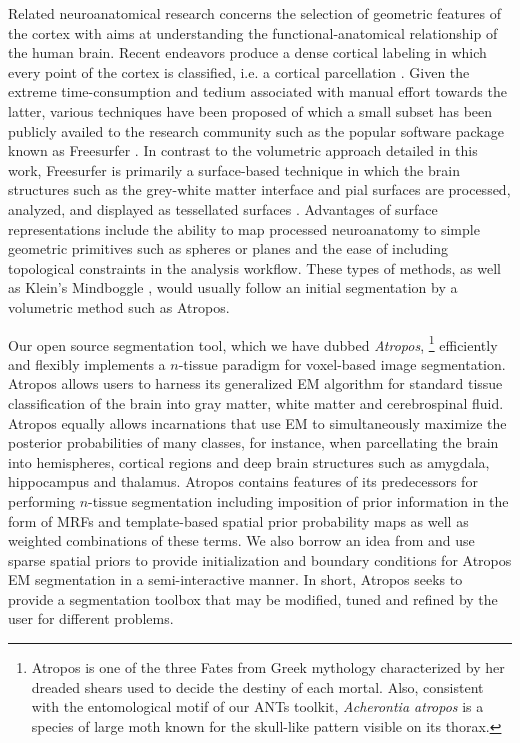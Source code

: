 \documentclass[11pt,english]{article}
\begin{document}
Related neuroanatomical research concerns the selection of geometric
features of the cortex \citep[e.g.][]{Goualher1999} with aims at
understanding the functional-anatomical relationship of the human
brain. Recent endeavors produce a dense cortical labeling in which
every point of the cortex is classified, i.e. a cortical parcellation
\citep{Fischl2004,Heckemann2006,Destrieux2010}.  Given the extreme
time-consumption and tedium associated with manual effort towards the
latter, various techniques have been proposed of which a small subset
has been publicly availed to the research community such as the
popular software package known as Freesurfer
\citep{Dale1999,Fischl1999,Fischl2004}.  In contrast to the volumetric
approach detailed in this work, Freesurfer is primarily a
surface-based technique in which the brain structures such as the
grey-white matter interface and pial surfaces are processed, analyzed,
and displayed as tessellated surfaces  \cite{Dale1999,Fischl1999}.
Advantages of surface representations include the ability to map
processed neuroanatomy to simple geometric primitives such as spheres
or planes and the ease of including topological constraints in the
analysis workflow.  These types of methods, as well as Klein's
Mindboggle \cite{Klein2005}, would usually follow an initial segmentation by a volumetric method such as Atropos.  



Our open source segmentation tool, which we have dubbed {\em
Atropos}, 
\footnote{ Atropos is one of the three Fates from Greek
mythology characterized by her dreaded shears used to decide the
destiny of each mortal.  Also, consistent with the entomological motif
of our ANTs toolkit, {\it Acherontia atropos} is a species of large
moth known for the skull-like pattern visible on its thorax.  }
efficiently and flexibly implements a $n$-tissue paradigm for
voxel-based image segmentation.  Atropos allows users to harness its
generalized EM algorithm for standard tissue classification of
the brain into gray matter, white matter and cerebrospinal fluid.
Atropos equally allows incarnations that use EM to simultaneously
maximize the posterior probabilities of many classes, for instance,
when parcellating the brain into hemispheres, cortical regions and
deep brain structures such as amygdala, hippocampus and
thalamus.  Atropos contains features of its predecessors for
performing $n$-tissue segmentation including imposition of prior
information in the form of MRFs and template-based spatial prior
probability maps as well as weighted combinations of these terms.  We
also borrow an idea from \cite{Boykov2004} and use sparse spatial
priors to provide initialization and boundary conditions for Atropos
EM segmentation in a semi-interactive manner.  In short, Atropos seeks
to provide a segmentation toolbox that may be modified,
tuned and refined by the user for different problems.
\end{document}
